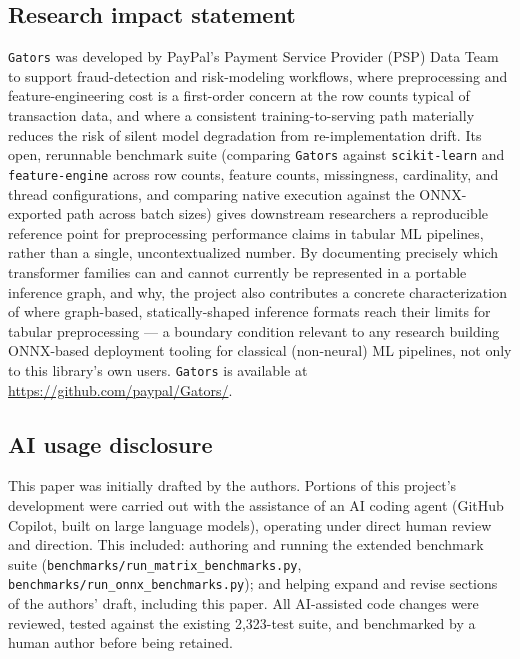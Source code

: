 \documentclass[
]{article}
\begin{document}
\subsection{Research impact statement}\label{research-impact-statement}

\texttt{Gators} was developed by PayPal's Payment Service Provider (PSP)
Data Team to support fraud-detection and risk-modeling workflows, where
preprocessing and feature-engineering cost is a first-order concern at
the row counts typical of transaction data, and where a consistent
training-to-serving path materially reduces the risk of silent model
degradation from re-implementation drift. Its open, rerunnable benchmark
suite (comparing \texttt{Gators} against \texttt{scikit-learn} and
\texttt{feature-engine} across row counts, feature counts, missingness,
cardinality, and thread configurations, and comparing native execution
against the ONNX-exported path across batch sizes) gives downstream
researchers a reproducible reference point for preprocessing performance
claims in tabular ML pipelines, rather than a single, uncontextualized
number. By documenting precisely which transformer families can and
cannot currently be represented in a portable inference graph, and why,
the project also contributes a concrete characterization of where
graph-based, statically-shaped inference formats reach their limits for
tabular preprocessing --- a boundary condition relevant to any research
building ONNX-based deployment tooling for classical (non-neural) ML
pipelines, not only to this library's own users. \texttt{Gators} is
available at \url{https://github.com/paypal/Gators/}.

\subsection{AI usage disclosure}\label{ai-usage-disclosure}

This paper was initially drafted by the authors. Portions of this
project's development were carried out with the assistance of an AI
coding agent (GitHub Copilot, built on large language models), operating
under direct human review and direction. This included: authoring and
running the extended benchmark suite
(\texttt{benchmarks/run\_matrix\_benchmarks.py},
\texttt{benchmarks/run\_onnx\_benchmarks.py}); and helping expand and
revise sections of the authors' draft, including this paper. All
AI-assisted code changes were reviewed, tested against the existing
2,323-test suite, and benchmarked by a human author before being
retained.
\end{document}
